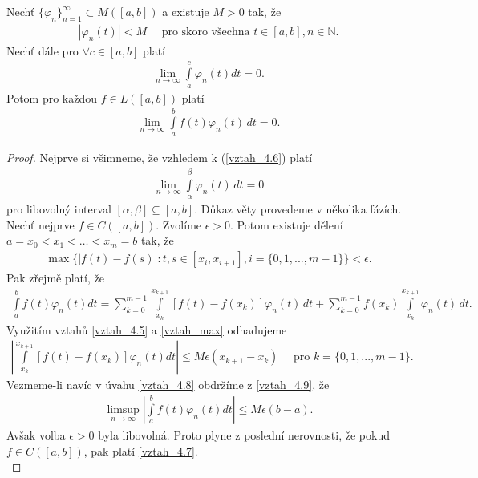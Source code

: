 \begin{theorem}[Lebesgue]\label{v_4.2}
Nechť $\{ \varphi_n \}_{n=1}^{\infty} \subset M ([a,b])$ a existuje $M > 0$ tak, že
\begin{align}\label{vztah_4.5}
|\varphi_n (t)| < M \quad \textrm{ pro skoro všechna } t \in [a,b], n \in \mathbb{N.}
\end{align}
Nechť dále pro $\forall c \in [a,b]$ platí
\begin{align}\label{vztah_4.6}
\lim_{n \rightarrow \infty} \int \limits_a^c \varphi_n (t) dt = 0.
\end{align}
Potom pro každou $f \in L([a,b])$ platí
\begin{align}\label{vztah_4.7}
\lim_{n \rightarrow \infty} \int \limits_a^b f(t) \varphi_n (t)\, dt = 0.
\end{align}
\begin{proof}
Nejprve si všimneme, že vzhledem k (\eqref{vztah_4.6}) platí
\begin{align}\label{vztah_4.8}
\lim_{n \rightarrow \infty} \int \limits_{\alpha}^{\beta} \varphi_n (t) \, dt = 0
\end{align}
pro libovolný interval $[\alpha, \beta] \subseteq [a,b]$. Důkaz věty provedeme v několika fázích. Nechť nejprve $f \in C([a,b])$. Zvolíme $\epsilon > 0$. Potom existuje dělení $a=x_0 < x_1 < \ldots < x_m = b$ tak, že
\begin{align}
\label{vztah_max}
\max \{ |f(t) - f(s)| : t,s \in [x_i, x_{i+1}], i = \{0,1,..., m-1\} \} < \epsilon.
\end{align}
Pak zřejmě platí, že
\begin{align}\label{vztah_4.9}
\int \limits_a^b f(t) \varphi_n (t) dt = \sum \limits _{k=0}^{m-1} \int \limits_{x_k}^{x_{k+1}} [f(t) - f(x_k)] \varphi_n (t)  \, dt + \sum \limits _{k=0}^{m-1} f(x_k) \int \limits_{x_k}^{x_{k+1}} \varphi_n (t) \, dt.
\end{align}
Využitím  vztah\r u \eqref{vztah_4.5} a \eqref{vztah_max} odhadujeme
\begin{align*}
\left| \int \limits_{x_k}^{x_{k+1}} [f(t) - f(x_k)] \varphi_n (t) dt \right| \leq M \epsilon (x_{k+1} - x_k) \quad \textrm{ pro } k = \{0,1,..., m-1\}.
\end{align*}
Vezmeme-li navíc v úvahu \eqref{vztah_4.8} obdržíme z \eqref{vztah_4.9}, že
\begin{align*}
\limsup_{n \rightarrow \infty} \left| \int \limits_a^b f(t) \varphi_n (t) dt \right| \leq M \epsilon (b-a).
\end{align*}
Avšak volba $\epsilon > 0$ byla libovolná. Proto plyne z poslední nerovnosti, že pokud $f \in C ([a,b])$, pak platí \eqref{vztah_4.7}. \\

\end{proof}
\end{theorem}
